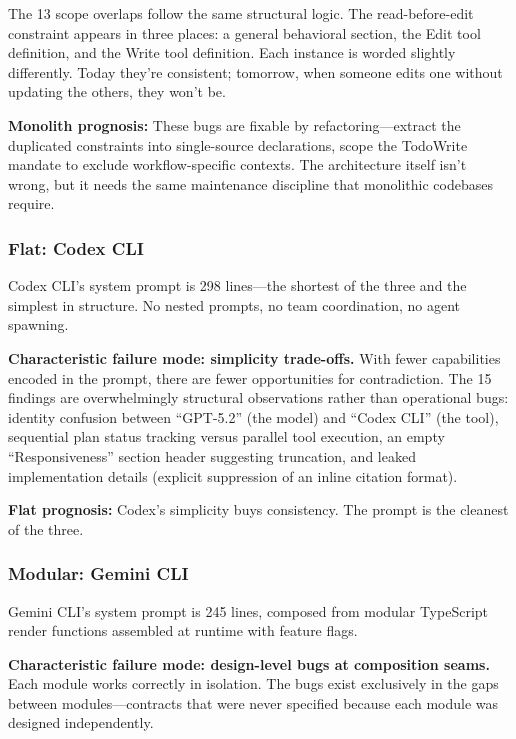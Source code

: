 \documentclass[11pt,a4paper]{article}
\begin{document}
The 13 scope overlaps follow the same structural logic. The
read-before-edit constraint appears in three places: a general
behavioral section, the Edit tool definition, and the Write tool
definition. Each instance is worded slightly differently. Today they're
consistent; tomorrow, when someone edits one without updating the
others, they won't be.

\textbf{Monolith prognosis:} These bugs are fixable by
refactoring---extract the duplicated constraints into single-source
declarations, scope the TodoWrite mandate to exclude workflow-specific
contexts. The architecture itself isn't wrong, but it needs the same
maintenance discipline that monolithic codebases require.


\subsubsection{Flat: Codex CLI}

Codex CLI's system prompt is 298 lines---the shortest of the three and
the simplest in structure. No nested prompts, no team coordination, no
agent spawning.

\textbf{Characteristic failure mode: simplicity trade-offs.} With fewer
capabilities encoded in the prompt, there are fewer opportunities for
contradiction. The 15 findings are overwhelmingly structural
observations rather than operational bugs: identity confusion between
``GPT-5.2'' (the model) and ``Codex CLI'' (the tool), sequential plan
status tracking versus parallel tool execution, an empty
``Responsiveness'' section header suggesting truncation, and leaked
implementation details (explicit suppression of an inline citation
format).

\textbf{Flat prognosis:} Codex's simplicity buys consistency. The
prompt is the cleanest of the three.


\subsubsection{Modular: Gemini CLI}

Gemini CLI's system prompt is 245 lines, composed from modular
TypeScript render functions assembled at runtime with feature flags.

\textbf{Characteristic failure mode: design-level bugs at composition
seams.} Each module works correctly in isolation. The bugs exist
exclusively in the gaps between modules---contracts that were never
specified because each module was designed independently.
\end{document}
